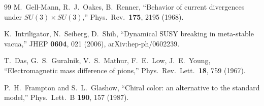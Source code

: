 \documentclass[12pt,a4paper]{article}
\begin{document}
\begin{thebibliography}{99}
M.~Gell-Mann, R.~J.~Oakes, B.~Renner, ``Behavior of current 
divergences under $SU(3) \times SU(3)$,'' 
Phys.\ Rev.\ \textbf{175}, 2195 (1968).

K.~Intriligator, N.~Seiberg, D.~Shih, ``Dynamical SUSY breaking 
in meta-stable vacua,'' JHEP \textbf{0604}, 021 (2006),
arXiv:hep-ph/0602239.

T.~Das, G.~S.~Guralnik, V.~S.~Mathur, F.~E.~Low, J.~E.~Young,
``Electromagnetic mass difference of pions,''
Phys.\ Rev.\ Lett.\ \textbf{18}, 759 (1967).

P.~H.~Frampton and S.~L.~Glashow, ``Chiral color: an alternative 
to the standard model,'' Phys.\ Lett.\ B \textbf{190}, 157 (1987).

\end{thebibliography}
\end{document}
